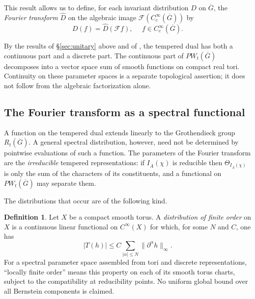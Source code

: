 \documentclass[12pt,letterpaper]{article}
\theoremstyle{definition}
\newtheorem{definition}[theorem]{Definition}
\theoremstyle{remark}
\newcommand{\sF}{\mathscr F}
\begin{document}
This result allows us to define, for each invariant distribution $D$ on
$\overline{G}$, the {\it Fourier transform} $\widehat D$ on the algebraic image $\sF(C_c^\infty(\overline G))$
by
\begin{equation}
D(f)=\widehat D(\sF f),\ \ \ \ \ \ f\in C_c^\infty(\overline{G }).
\label{eqn:FT}
\end{equation}

By the results of \S \ref{sec:unitary}
above and of \cite{FK86},
the tempered dual has both a continuous
part and a discrete part. The continuous part of
$PW_t(\overline{G })$ decomposes
into a vector space sum of smooth functions on compact real tori.
Continuity on these parameter spaces is a separate topological assertion; it does not follow from the algebraic factorization alone.

\subsection{The Fourier transform as a spectral functional}
\label{subsec:main}

A function on the tempered dual extends linearly to the Grothendieck
group $R_t(\overline{G})$.  A general spectral distribution, however,
need not be determined by pointwise evaluations of such a function. 
The parameters of the Fourier transform are the \emph{irreducible} tempered
representations: if $I_{\overline{A}}(\chi)$ is reducible then $\Theta_{I_{\overline{A}}(\chi)}$ is only the sum of
the characters of its constituents, and a functional on $PW_t(\overline{G})$ may separate them.

The distributions that occur are of the following kind.

\begin{definition}\label{def:finite-order}
Let $X$ be a compact smooth torus.  A \emph{distribution of finite order}
on $X$ is a continuous linear functional on $C^\infty(X)$ for which,
for some $N$ and $C$, one has
\[
 |T(h)|\le C\sum_{|\alpha|\le N}\|\partial^\alpha h\|_\infty.
\]
For a spectral parameter space assembled from tori and discrete
representations, ``locally finite order'' means this property on each
of its smooth torus charts, subject to the compatibility at reducibility
points.  No uniform global bound over all Bernstein components is claimed.
\end{definition}
\end{document}
